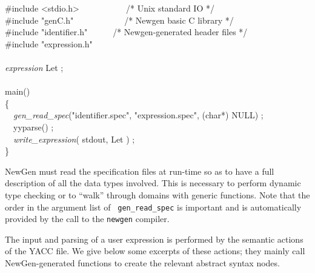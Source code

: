 \begin{pgm}
\#include <stdio.h>~~~~~~~~~~~/* Unix standard IO */\\
\#include "genC.h"~~~~~~~~~~~~/* Newgen basic C library */ \\
\#include "identifier.h"~~~~~~/* Newgen-generated header files */ \\
\#include "expression.h" \\
 \\
{\sl expression} Let ; \\
 \\
main() \\
\{ \\
~~{\sl gen\_read\_spec}("identifier.spec", "expression.spec", 
                                (char*) NULL) ; \\
~~yyparse() ; \\
~~{\sl write\_expression}( stdout, Let ) ; \\
\}
\end{pgm}

NewGen must read the specification files at run-time so as to have a
full description of all the data types involved. This is necessary to
perform dynamic type checking or to ``walk'' through domains with
generic functions. Note that the order in the argument list of {\tt
gen\_read\_spec} is important and is automatically provided by the call
to the {\tt newgen} compiler.

The input and parsing of a user expression is performed by the semantic
actions of the YACC file. We give below some excerpts of these actions;
they mainly call NewGen-generated functions to create the relevant
abstract syntax nodes.

